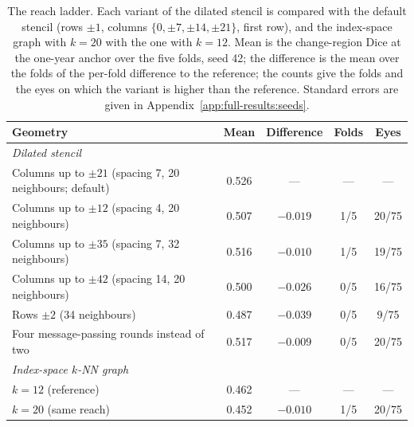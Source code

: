 \begin{table}[t]
  \centering
  \caption[The reach ladder.]{%
    The reach ladder. Each variant of the dilated stencil is compared with
    the default stencil (rows $\pm 1$, columns $\{0, \pm 7, \pm 14, \pm
    21\}$, first row), and the index-space graph with $k = 20$ with the one
    with $k = 12$. Mean is the change-region Dice at the one-year anchor
    over the five folds, seed 42; the difference is the mean over the folds
    of the per-fold difference to the reference; the counts give the folds
    and the eyes on which the variant is higher than the reference. Standard
    errors are given in Appendix~\ref{app:full-results:seeds}.}
  \label{tab:experiments:reach}
  \small
  \begin{tabular}{p{} c c c c}
    \toprule
    Geometry & Mean & Difference & Folds & Eyes \\
    \midrule
    \multicolumn{5}{l}{\emph{Dilated stencil}} \\
    Columns up to $\pm 21$ (spacing 7, 20 neighbours; default) & 0.526 & --- & --- & --- \\
    Columns up to $\pm 12$ (spacing 4, 20 neighbours) & 0.507 & $-0.019$ & 1/5 & 20/75 \\
    Columns up to $\pm 35$ (spacing 7, 32 neighbours) & 0.516 & $-0.010$ & 1/5 & 19/75 \\
    Columns up to $\pm 42$ (spacing 14, 20 neighbours) & 0.500 & $-0.026$ & 0/5 & 16/75 \\
    Rows $\pm 2$ (34 neighbours) & 0.487 & $-0.039$ & 0/5 & 9/75 \\
    Four message-passing rounds instead of two & 0.517 & $-0.009$ & 0/5 & 20/75 \\
    \midrule
    \multicolumn{5}{l}{\emph{Index-space $k$-NN graph}} \\
    $k = 12$ (reference) & 0.462 & --- & --- & --- \\
    $k = 20$ (same reach) & 0.452 & $-0.010$ & 1/5 & 20/75 \\
    \bottomrule
  \end{tabular}
\end{table}

